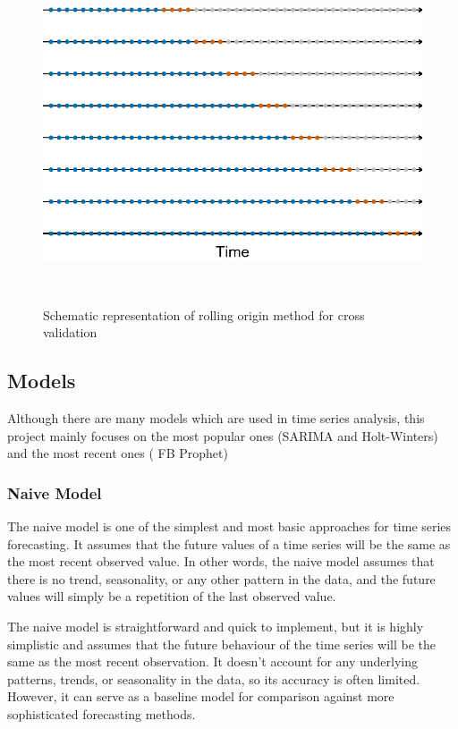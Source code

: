 \documentclass[
]{article}
\begin{document}
\begin{figure}
\centering
\includegraphics[width=10.61458in,height=3.90625in]{Plots/rolling-origin-cross-validation.png}
\caption{Schematic representation of rolling origin method for cross
validation}
\end{figure}

\hypertarget{models}{%
\subsection{Models}\label{models}}

Although there are many models which are used in time series analysis,
this project mainly focuses on the most popular ones (SARIMA and
Holt-Winters) and the most recent ones ( FB Prophet)

\hypertarget{naive-model}{%
\subsubsection{Naive Model}\label{naive-model}}

The naive model is one of the simplest and most basic approaches for
time series forecasting. It assumes that the future values of a time
series will be the same as the most recent observed value. In other
words, the naive model assumes that there is no trend, seasonality, or
any other pattern in the data, and the future values will simply be a
repetition of the last observed value.

The naive model is straightforward and quick to implement, but it is
highly simplistic and assumes that the future behaviour of the time
series will be the same as the most recent observation. It doesn't
account for any underlying patterns, trends, or seasonality in the data,
so its accuracy is often limited. However, it can serve as a baseline
model for comparison against more sophisticated forecasting methods.
\end{document}
